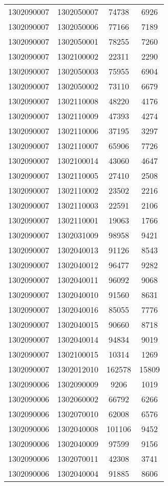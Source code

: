 \begin{longtable}[h]{llcc}
		1302090007 & 1302050007 & 74738 & 6926\\
		1302090007 & 1302050006 & 77166 & 7189\\
		1302090007 & 1302050001 & 78255 & 7260\\
		1302090007 & 1302100002 & 22311 & 2290\\
		1302090007 & 1302050003 & 75955 & 6904\\
		1302090007 & 1302050002 & 73110 & 6679\\
		1302090007 & 1302110008 & 48220 & 4176\\
		1302090007 & 1302110009 & 47393 & 4274\\
		1302090007 & 1302110006 & 37195 & 3297\\
		1302090007 & 1302110007 & 65906 & 7726\\
		1302090007 & 1302100014 & 43060 & 4647\\
		1302090007 & 1302110005 & 27410 & 2508\\
		1302090007 & 1302110002 & 23502 & 2216\\
		1302090007 & 1302110003 & 22591 & 2106\\
		1302090007 & 1302110001 & 19063 & 1766\\
		1302090007 & 1302031009 & 98958 & 9421\\
		1302090007 & 1302040013 & 91126 & 8543\\
		1302090007 & 1302040012 & 96477 & 9282\\
		1302090007 & 1302040011 & 96092 & 9068\\
		1302090007 & 1302040010 & 91560 & 8631\\
		1302090007 & 1302040016 & 85055 & 7776\\
		1302090007 & 1302040015 & 90660 & 8718\\
		1302090007 & 1302040014 & 94834 & 9019\\
		1302090007 & 1302100015 & 10314 & 1269\\
		1302090007 & 1302012010 & 162578 & 15809\\
		1302090006 & 1302090009 & 9206 & 1019\\
		1302090006 & 1302060002 & 66792 & 6266\\
		1302090006 & 1302070010 & 62008 & 6576\\
		1302090006 & 1302040008 & 101106 & 9452\\
		1302090006 & 1302040009 & 97599 & 9156\\
		1302090006 & 1302070011 & 42308 & 3741\\
		1302090006 & 1302040004 & 91885 & 8606\\

\end{longtable}
